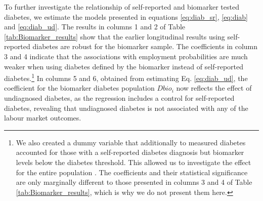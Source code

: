 To further investigate the relationship of self-reported and biomarker tested diabetes, we estimate the models presented in equations \ref{eq:diab_sr}, \ref{eq:diab} and \ref{eq:diab_ud}.  
The results in columns 1 and 2 of Table \ref{tab:Biomarker_results} show that the earlier longitudinal results using self-reported diabetes are robust for the biomarker sample. The coefficients in column 3 and 4 indicate that the associations with employment probabilities are much weaker when using diabetes defined by the biomarker instead of self-reported diabetes.\footnote{We also created a dummy variable that additionally to measured diabetes accounted for those with a self-reported diabetes diagnosis but biomarker levels below the diabetes threshold. This allowed us to investigate the effect for the entire \DIFdelbegin {}\DIFdelend population \DIFaddbegin {}\DIFaddend . The coefficients and their statistical significance are only marginally different to those presented in columns 3 and 4 of Table \ref{tab:Biomarker_results}, which is why we do not present them here.} In columns 5 and 6, obtained from estimating Eq. \ref{eq:diab_ud}, the coefficient for the biomarker diabetes population $Dbio_i$ now reflects the effect of undiagnosed diabetes, as the regression includes a control for self-reported diabetes, revealing that undiagnosed diabetes is not associated with any of the labour market outcomes. 

